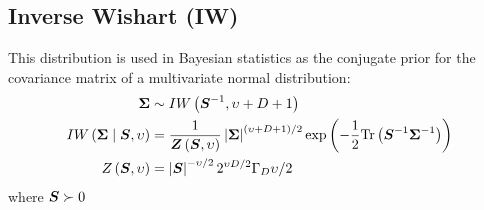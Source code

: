 \documentclass{article}
\begin{document}
\subsection{Inverse Wishart (IW)}
This distribution is used in Bayesian statistics as the conjugate prior for the
  covariance matrix of a multivariate normal distribution:
  \begin{align*}
    {\boldsymbol{\Sigma}} & \sim { IW  \left(  {\boldsymbol{S}} ^{-1}, \upsilon + D + 1 \right)  } \\
    { IW \left( {\boldsymbol{\Sigma}} \mid {\boldsymbol{S}}, \upsilon \right) } &=
      \dfrac{1}{{ {\boldsymbol{Z}} \left( {\boldsymbol{S}}, \upsilon \right) }} \left\lvert {\boldsymbol{\Sigma}} \right\rvert^{(\upsilon+D+1)/2}
        { \exp \left( -\dfrac{1}{2} \text{Tr}\left( {\boldsymbol{S}}^{-1} {\boldsymbol{\Sigma}}^{-1} \right) \right) } \\
    { Z \left( {\boldsymbol{S}}, \upsilon \right) } &= \left\lvert {\boldsymbol{S}} \right\rvert^{-\upsilon/2} 2^{\upsilon D/2} \Gamma_D{\upsilon/2}
  \end{align*}
where ${\boldsymbol{S}} \succ 0$
\end{document}
